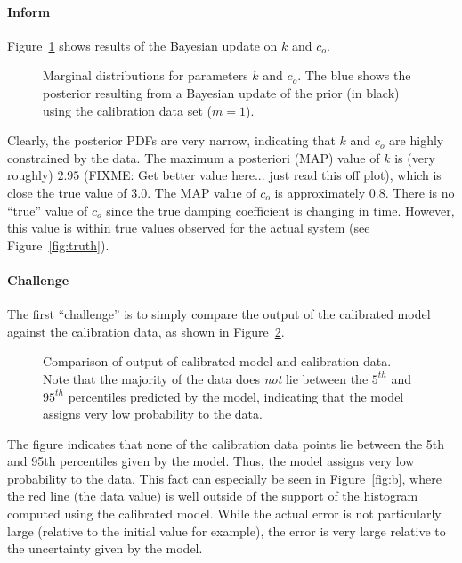\documentclass[11pt]{article}
\begin{document}
\paragraph{Inform}
Figure~\ref{fig:si0_params} shows results of the Bayesian update on
$k$ and $c_o$.
%
\begin{figure}[ht]
\begin{center}
\end{center}
\caption{Marginal distributions for parameters $k$ and $c_o$.  The
  blue shows the posterior resulting from a Bayesian update of the
  prior (in black) using the calibration data set ($m=1$).}
\label{fig:si0_params}
\end{figure}
% 
Clearly, the posterior PDFs are very narrow, indicating that $k$ and
$c_o$ are highly constrained by the data.  The maximum a posteriori
(MAP) value of $k$ is (very roughly) $2.95$ (FIXME: Get better value
here... just read this off plot), which is close the true value of
$3.0$.  The MAP value of $c_o$ is approximately 0.8.  There is no
``true'' value of $c_o$ since the true damping coefficient is changing
in time.  However, this value is within true values observed for the
actual system (see Figure~\ref{fig:truth}).

\paragraph{Challenge}
The first ``challenge'' is to simply compare the output of the
calibrated model against the calibration data, as shown in
Figure~\ref{fig:si0_cal_challenge}.
%
\begin{figure}[ht]
\begin{center}
\end{center}
\caption{Comparison of output of calibrated model and calibration
  data.  Note that the majority of the data does \emph{not} lie
  between the $5^{th}$ and $95^{th}$ percentiles predicted by the
  model, indicating that the model assigns very low probability to the
  data.}
\label{fig:si0_cal_challenge}
\end{figure}
%
The figure indicates that none of the calibration data points lie
between the 5th and 95th percentiles given by the model.  Thus,
the model assigns very low probability to the data.  This fact can
especially be seen in Figure~\ref{fig:b}, where the red line (the data
value) is well outside of the support of the histogram computed using
the calibrated model.  While the actual error is not particularly
large (relative to the initial value for example), the error is very large
relative to the uncertainty given by the model.
\end{document}
